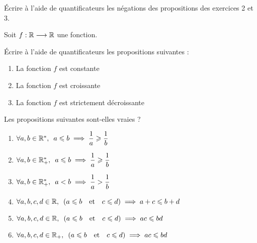 \begin{exo}
Écrire à l'aide de quantificateurs les négations des propositions des exercices 2 et 3.
\end{exo}

\begin{corr}
\end{corr}

\begin{exo}
Soit \(f:\mathbb{R}\longrightarrow\mathbb{R}\) une fonction.

Écrire à l'aide de quantificateurs les propositions suivantes :

\begin{enumerate}
\item La fonction \(f\) est constante \\

\item La fonction \(f\) est croissante \\

\item La fonction \(f\) est strictement décroissante
\end{enumerate}
\end{exo}

\begin{corr}
\end{corr}

\begin{exo}
Les propositions suivantes sont-elles vraies ?

\begin{enumerate}
\item \(\quantifs{\forall a,b\in\Rs}a\leq b\imp\dfrac{1}{a}\geq\dfrac{1}{b}\) \\

\item \(\quantifs{\forall a,b\in\Rps}a\leq b\imp\dfrac{1}{a}\geq\dfrac{1}{b}\) \\

\item \(\quantifs{\forall a,b\in\Rps}a<b\imp\dfrac{1}{a}>\dfrac{1}{b}\) \\

\item \(\quantifs{\forall a,b,c,d\in\R}\paren{a\leq b\quad\text{et}\quad c\leq d}\imp a+c\leq b+d\) \\

\item \(\quantifs{\forall a,b,c,d\in\R}\paren{a\leq b\quad\text{et}\quad c\leq d}\imp ac\leq bd\) \\

\item \(\quantifs{\forall a,b,c,d\in\Rp}\paren{a\leq b\quad\text{et}\quad c\leq d}\imp ac\leq bd\)
\end{enumerate}
\end{exo}

